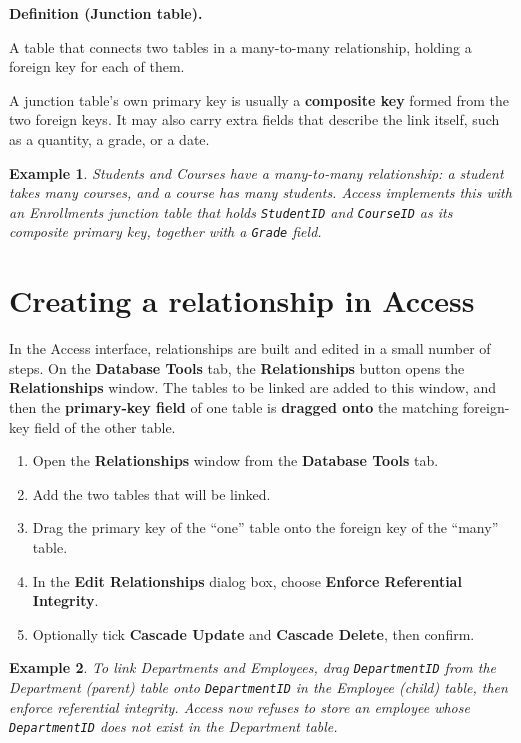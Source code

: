\documentclass[11pt]{article}
\newtheorem{example}{Example}[section]
\newenvironment{definitionbox}[1]{%
  \par\noindent\textbf{Definition (#1).}\ \itshape
}{\par\vspace{0.3em}}
\begin{document}
\begin{definitionbox}{Junction table}
A table that connects two tables in a many-to-many relationship, holding a
foreign key for each of them.
\end{definitionbox}

A junction table's own primary key is usually a \textbf{composite key} formed
from the two foreign keys. It may also carry extra fields that describe the
link itself, such as a quantity, a grade, or a date.

\begin{example}
Students and Courses have a many-to-many relationship: a student takes many
courses, and a course has many students. Access implements this with an
Enrollments junction table that holds \texttt{StudentID} and \texttt{CourseID}
as its composite primary key, together with a \texttt{Grade} field.
\end{example}

\section{Creating a relationship in Access}
In the Access interface, relationships are built and edited in a small number
of steps. On the \textbf{Database Tools} tab, the \textbf{Relationships} button
opens the \textbf{Relationships} window. The tables to be linked are added to
this window, and then the \textbf{primary-key field} of one table is
\textbf{dragged onto} the matching foreign-key field of the other table.

\begin{enumerate}
  \item Open the \textbf{Relationships} window from the \textbf{Database Tools}
    tab.
  \item Add the two tables that will be linked.
  \item Drag the primary key of the ``one'' table onto the foreign key of the
    ``many'' table.
  \item In the \textbf{Edit Relationships} dialog box, choose
    \textbf{Enforce Referential Integrity}.
  \item Optionally tick \textbf{Cascade Update} and \textbf{Cascade Delete},
    then confirm.
\end{enumerate}

\begin{example}
To link Departments and Employees, drag \texttt{DepartmentID} from the
Department (parent) table onto \texttt{DepartmentID} in the Employee (child)
table, then enforce referential integrity. Access now refuses to store an
employee whose \texttt{DepartmentID} does not exist in the Department table.
\end{example}
\end{document}
